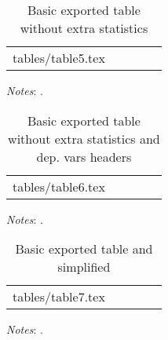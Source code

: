 \documentclass[a4paper]{article}
\makeatletter
\newcommand\primitiveinput[1]
{\@@input #1 }
\makeatother
\begin{document}
\begin{table}[H]
	\centering
	\label{tab:Table5}
	\begin{adjustbox}{max width=\linewidth}
		\begin{threeparttable}
			\caption{Basic exported table without extra statistics}
			\begin{tabular}{@{}l*{4}{c}@{}}
                \toprule
                \toprule 
				\primitiveinput{tables/table5.tex}
				\bottomrule
			\end{tabular}
			\begin{tablenotes}
				\setlength{}
				\footnotesize
				\item \textit{Notes}: \lipsum[1].
			\end{tablenotes}
		\end{threeparttable}
	\end{adjustbox}
\end{table}
\newpage 

\begin{table}[H]
	\centering
	\label{tab:Table6}
	\begin{adjustbox}{max width=\linewidth}
		\begin{threeparttable}
			\caption{Basic exported table without extra statistics and dep. vars headers}
			\begin{tabular}{@{}l*{4}{c}@{}}
                \toprule
                \toprule 
				\primitiveinput{tables/table6.tex}
				\bottomrule
			\end{tabular}
			\begin{tablenotes}
				\setlength\labelsep{0pt}
				\footnotesize
				\item \textit{Notes}: \lipsum[1].
			\end{tablenotes}
		\end{threeparttable}
	\end{adjustbox}
\end{table}
\newpage 

\begin{table}[H]
	\centering
	\label{tab:Table7}
	\begin{adjustbox}{max width=\linewidth}
		\begin{threeparttable}
			\caption{Basic exported table and simplified}
			\begin{tabular}{@{}l*{4}{c}@{}}
                \toprule
                \toprule 
				\primitiveinput{tables/table7.tex}
				\bottomrule
			\end{tabular}
			\begin{tablenotes}
				\setlength\labelsep{0pt}
				\footnotesize
				\item \textit{Notes}: \lipsum[1].
			\end{tablenotes}
		\end{threeparttable}
	\end{adjustbox}
\end{table}
\end{document}
